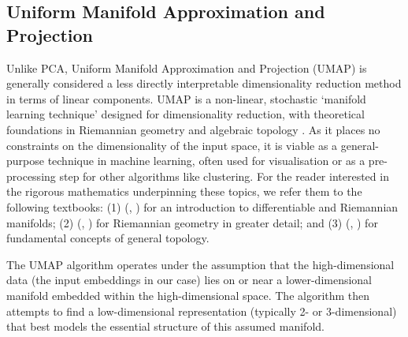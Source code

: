 \documentclass[10pt,oneside]{report}
\renewcommand{\citet}[1]{\citeauthor{#1}, \citeyear{#1}}
\begin{document}

\subsection{Uniform Manifold Approximation and Projection}\label{sec:umap}

Unlike PCA, Uniform Manifold Approximation and Projection (UMAP) is generally considered a less directly interpretable dimensionality reduction method in terms of linear components. UMAP is a non-linear, stochastic `manifold learning technique' designed for dimensionality reduction, with theoretical foundations in Riemannian geometry and algebraic topology \cite{mcinnes2018umap}. As it places no constraints on the dimensionality of the input space, it is viable as a general-purpose technique in machine learning, often used for visualisation or as a pre-processing step for other algorithms like clustering. For the reader interested in the rigorous mathematics underpinning these topics, we refer them to the following textbooks: (1) (\citet{lee2003smooth}) for an introduction to differentiable and Riemannian manifolds; (2) (\citet{lee2006riemannian}) for Riemannian geometry in greater detail; and (3) (\citet{willard2012general}) for fundamental concepts of general topology.

The UMAP algorithm operates under the assumption that the high-dimensional data (the input embeddings in our case) lies on or near a lower-dimensional manifold embedded within the high-dimensional space. The algorithm then attempts to find a low-dimensional representation (typically 2- or 3-dimensional) that best models the essential structure of this assumed manifold. \\
\end{document}
